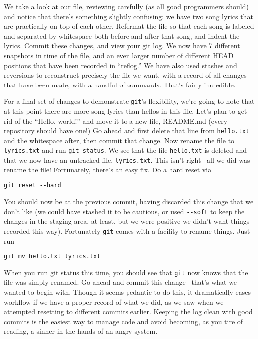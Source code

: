 {\par{
We take a look at our file, reviewing carefully (as all good programmers
should) and notice that there's something slightly confusing: we have two song
lyrics that are practically on top of each other. Reformat the file so that
each song is labeled and separated by whitespace both before and after that
song, and indent the lyrics. Commit these changes, and view your git log. We
now have 7 different snapshots in time of the file, and an even larger number
of different HEAD positions that have been recorded in ``reflog.'' We have
also used stashes and reversions to reconstruct precisely the file we want,
with a record of all changes that have been made, with a handful of commands.
That's fairly incredible.
}

\par{
For a final set of changes to demonstrate \verb+git+'s flexibility, we're
going to note that at this point there are more song lyrics than hellos in
this file. Let's plan to get rid of the ``Hello, world!'' and move it to a new
file, README.md (every repository should have one!)
Go ahead and first delete that line from \verb+hello.txt+ and the whitespace
after, then commit that change. Now rename the file to \verb+lyrics.txt+ and
run \verb+git status+. We see that the file \verb+hello.txt+ is deleted and
that we now have an untracked file, \verb+lyrics.txt+. This isn't right-- all
we did was rename the file! Fortunately, there's an easy fix. Do a hard reset
via
}

\begin{verbatim}
git reset --hard
\end{verbatim}

\par{
You should now be at the previous commit, having discarded this change that we
don't like (we could have stashed it to be cautious, or used \verb+--soft+ to
keep the changes in the staging area, at least, but we were positive we didn't
want things recorded this way). Fortunately \verb+git+ comes with a facility
to rename things. Just run
}

\begin{verbatim}
git mv hello.txt lyrics.txt
\end{verbatim}

\par{
When you run git status this time, you should see that \verb+git+ now knows
that the file was simply renamed. Go ahead and commit this change-- that's
what we wanted to begin with. Though it seems pedantic to do this, it
dramatically eases workflow if we have a proper record of what we did, as we
saw when we attempted resetting to different commits earlier.
Keeping the log clean with good commits is the easiest way to manage code and
avoid becoming, as you tire of reading, a sinner in the hands of an angry
system.
}

}
